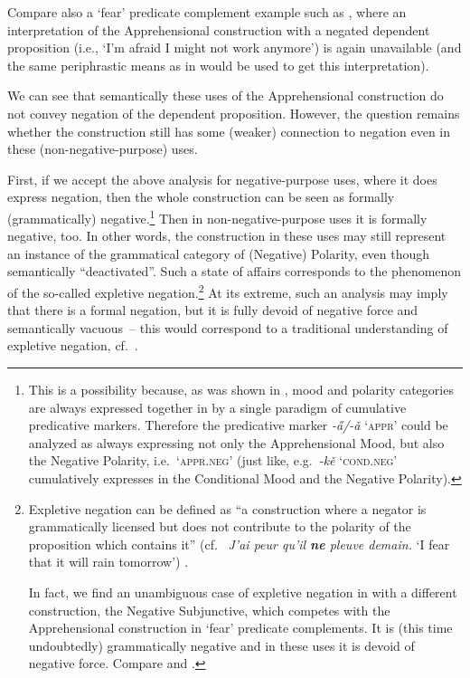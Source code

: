 \documentclass[output=paper,colorlinks,citecolor=brown]{langscibook}
\begin{document}
 Compare also a `fear' predicate complement example such as , where an interpretation of the Apprehensional construction with a negated dependent proposition (i.e.,  `I'm afraid I might not work anymore') is again unavailable (and the same periphrastic means as in  would be used to get this interpretation).


\z

 We can see that semantically these uses of the Apprehensional construction do not convey negation of the dependent proposition. However, the question remains whether the construction still has some (weaker) connection to negation even in these (non-negative-purpose) uses.

First, if we accept the above analysis for negative-purpose uses, where it does express negation, then the whole construction can be seen as formally (grammatically) negative.\footnote{This is a possibility because, as was shown in , mood and polarity categories are always expressed together in  by a single paradigm of cumulative predicative markers. Therefore the predicative marker \textit{-a̋/-ǎ} `\textsc{appr}' could be analyzed as always expressing not only the Apprehensional Mood, but also the Negative Polarity, i.e.\ `\textsc{appr.neg}' (just like, e.g.\ \textit{-kě} `\textsc{cond.neg}' cumulatively expresses in  the Conditional Mood and the Negative Polarity).} Then in non-negative-purpose uses it is formally negative, too. In other words, the construction in these uses may still represent an instance of the grammatical category of (Negative) Polarity, even though semantically ``deactivated''. Such a state of affairs corresponds to the phenomenon of the so-called expletive negation.\footnote{Expletive negation can be defined as ``a construction where a negator is grammatically licensed but does not contribute to the polarity of the proposition which contains it'' (cf.\  \textit{J'ai peur qu'il \textbf{ne} pleuve demain.} `I fear that it will rain tomorrow') \citep[1]{jinkoenig2020}.

In fact, we find an unambiguous case of expletive negation in  with a different construction, the Negative Subjunctive, which competes with the Apprehensional construction in `fear' predicate complements. It is (this time undoubtedly) grammatically negative and in these uses it is devoid of negative force. Compare  and .} At its extreme, such an analysis may imply that there is a formal negation, but it is fully devoid of negative force and semantically vacuous~-- this would correspond to a traditional understanding of expletive negation, cf.\ \citet{espinal1992}.
\end{document}
